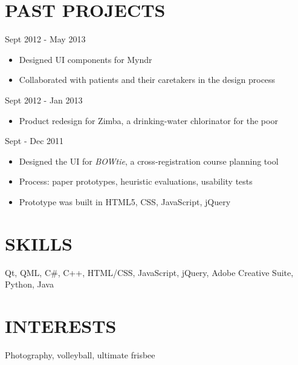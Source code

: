 \documentclass[margin]{res}
\begin{document}
 \vspace{3mm}

\section{PAST PROJECTS \\}


\hspace*{7mm}{ \bf Myndr iOS App: An Aid for Alzheimer's disease}   \hfill            Sept 2012 - May 2013\ 
	\smallskip
	\begin{itemize}  \itemsep -4pt %
	
	 \item Designed UI components for Myndr
	\item Collaborated with patients and their caretakers in the design process
	\end{itemize}


\hspace*{7mm}{ \bf Zimba, a Water Purifier in India}   \hfill            Sept 2012 - Jan 2013\ 
	\smallskip
	\begin{itemize}  \itemsep -4pt %
	
	 \item Product redesign for Zimba, a drinking-water chlorinator for the poor 
	\end{itemize}


\hspace*{7mm}{\bf Human Factors Interface Design} \hfill Sept - Dec 2011\
\smallskip
	\begin{itemize}  \itemsep -4pt %
		
	\item Designed the UI for {\emph {BOWtie}}, a cross-registration course planning tool
	\item Process: paper prototypes, heuristic evaluations, usability tests
	\item Prototype was built in HTML5, CSS, JavaScript, jQuery %
	\end{itemize}



\vspace*{9mm}

\section{SKILLS} \hspace*{7mm} Qt, QML, C\#, C++, HTML/CSS, JavaScript, jQuery, Adobe Creative Suite, Python, Java
\vspace*{-4mm}
\section {INTERESTS} \hspace*{7mm} Photography, volleyball, ultimate frisbee
\end{document}
